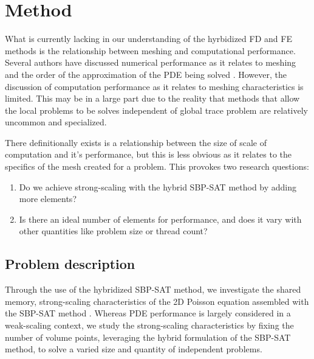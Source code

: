 
\section{Method} %

What is currently lacking in our understanding of the hyrbidized FD and 
FE methods is the relationship between meshing and computational performance. Several authors have discussed numerical performance as it relates to meshing and
the order of the approximation of the PDE being solved \citep{}. However, the discussion of computation performance as it relates to meshing characteristics is limited. This may be in a large part due to the reality that methods that allow the local problems to be solves independent of global trace problem are relatively 
uncommon and specialized. 

There definitionally exists is a relationship between the size of scale of computation and it's performance, but this is less obvious as it relates
to the specifics of the mesh created for a problem. This provokes two 
research questions:

\begin{enumerate}[label=\textbf{\footnotesize RQ\arabic*.}]
	\item {Do we achieve strong-scaling with the hybrid \mbox{SBP-SAT} 
		   method by adding more elements?}
	\item {Is there an ideal number of elements for performance, and does it 
		   vary with other quantities like problem size or thread count?}
\end{enumerate}

\subsection{Problem description} %

Through the use of the hybridized SBP-SAT method, we investigate 
the shared memory, strong-scaling characteristics of the 2D Poisson 
equation assembled with the SBP-SAT method \citep{kozdon2021hybridized}. 
Whereas PDE performance is largely considered in a weak-scaling context,
we study the strong-scaling characteristics by fixing the number of 
volume points, leveraging the hybrid formulation of the SBP-SAT method, 
to solve a varied size and quantity of independent problems.

